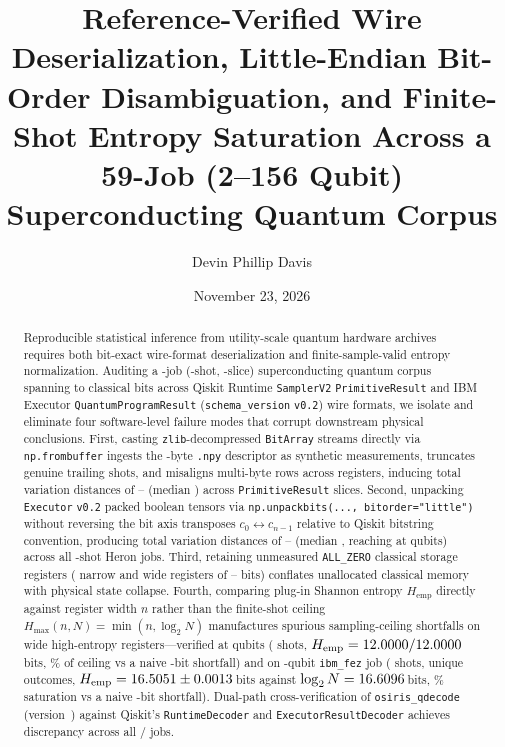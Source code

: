 \documentclass[twocolumn,aps,prapplied,superscriptaddress,floatfix]{revtex4-2}
\begin{document}
\title{Reference-Verified Wire Deserialization, Little-Endian Bit-Order Disambiguation, and Finite-Shot Entropy Saturation Across a 59-Job (2--156 Qubit) Superconducting Quantum Corpus}

\author{Devin Phillip Davis}

\date{November 23, 2026}

\begin{abstract}
Reproducible statistical inference from utility-scale quantum hardware archives requires both bit-exact wire-format deserialization and finite-sample-valid entropy normalization. Auditing a \QdTotalJobs{}-job (\QdTotalCorpusShots{}-shot, \QdTotalSlices{}-slice) superconducting quantum corpus spanning \QdMinBits{} to \QdMaxBits{} classical bits across Qiskit Runtime \texttt{SamplerV2} \texttt{PrimitiveResult} and IBM Executor \texttt{QuantumProgramResult} (\texttt{schema\_version} \texttt{v0.2}) wire formats, we isolate and eliminate four software-level failure modes that corrupt downstream physical conclusions. First, casting \texttt{zlib}-decompressed \texttt{BitArray} streams directly via \texttt{np.frombuffer} ingests the \QdNpyHeaderBytes{}-byte \texttt{.npy} descriptor as synthetic measurements, truncates genuine trailing shots, and misaligns multi-byte rows across \QdUnalignedSlices{} registers, inducing total variation distances of \QdLegacyTvdMin{}--\QdLegacyTvdMax{} (median \QdLegacyTvdMedian{}) across \QdPrimSlices{} \texttt{PrimitiveResult} slices. Second, unpacking \texttt{Executor} \texttt{v0.2} packed boolean tensors via \texttt{np.unpackbits(..., bitorder="little")} without reversing the bit axis transposes $c_0 \leftrightarrow c_{n-1}$ relative to Qiskit bitstring convention, producing total variation distances of \QdExecRevTvdMin{}--\QdExecRevTvdMax{} (median \QdExecRevTvdMedian{}, reaching \QdExecRevTvdMax{} at \QdFezWideBits{} qubits) across all \QdExecJobs{} \QdExecShotsEach{}-shot Heron jobs. Third, retaining \QdAllZeroSlices{} unmeasured \texttt{ALL\_ZERO} classical storage registers (\QdAllZeroNarrow{} narrow and \QdAllZeroWide{} wide registers of \QdAllZeroWideMinBits{}--\QdAllZeroWideMaxBits{} bits) conflates unallocated classical memory with physical state collapse. Fourth, comparing plug-in Shannon entropy $H_{\mathrm{emp}}$ directly against register width $n$ rather than the finite-shot ceiling $H_{\max}(n,N) = \min(n, \log_2 N)$ manufactures spurious sampling-ceiling shortfalls on wide high-entropy registers—verified at \QdArchWideBits{} qubits (\QdArchWideShots{} shots, $H_{\mathrm{emp}}=12.0000/12.0000$\,bits, \QdArchWideRatioPct\% of ceiling vs a naive \QdArchNaiveDeficit-bit shortfall) and on \QdFezWideBits{}-qubit \texttt{ibm\_fez} job \texttt{\QdFezWideJobId} (\QdFezWideShots{} shots, \QdFezWideUnique{} unique outcomes, $H_{\mathrm{emp}}=16.5051 \pm 0.0013$\,bits against $\log_2 N = 16.6096$\,bits, \QdFezWideRatioPct\% saturation vs a naive \QdFezNaiveDeficit-bit shortfall). Dual-path cross-verification of \texttt{osiris\_qdecode} (version~\texttt{\QdDecoderVersion}) against Qiskit's \texttt{RuntimeDecoder} and \texttt{ExecutorResultDecoder} achieves \QdRefParityTvd{} discrepancy across all \QdTotalJobs/\QdTotalJobs{} jobs.
\end{abstract}
\end{document}
